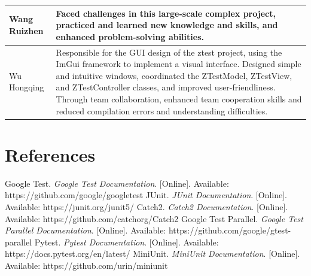 \documentclass{article}
\begin{document}
\begin{tabular}{|p{50pt}|p{350pt}|}
    Wang Ruizhen   & Faced challenges in this large-scale complex project, practiced and learned new knowledge and skills, and enhanced problem-solving abilities.                                                                                                                                                                                                                                                                                                                                                                                                                                                            \\ \hline
    Wu Hongqing    & Responsible for the GUI design of the ztest project, using the ImGui framework to implement a visual interface. Designed simple and intuitive windows, coordinated the ZTestModel, ZTestView, and ZTestController classes, and improved user-friendliness. Through team collaboration, enhanced team cooperation skills and reduced compilation errors and understanding difficulties.                                                                                                                                                                                                                   \\ \hline
\end{tabular}
\section{References}
\begin{thebibliography}{99}
     Google Test. \textit{Google Test Documentation}. [Online]. Available: https://github.com/google/googletest
     JUnit. \textit{JUnit Documentation}. [Online]. Available: https://junit.org/junit5/
     Catch2. \textit{Catch2 Documentation}. [Online]. Available: https://github.com/catchorg/Catch2
     Google Test Parallel. \textit{Google Test Parallel Documentation}. [Online]. Available: https://github.com/google/gtest-parallel
     Pytest. \textit{Pytest Documentation}. [Online]. Available: https://docs.pytest.org/en/latest/
     MiniUnit. \textit{MiniUnit Documentation}. [Online]. Available: https://github.com/urin/miniunit
\end{thebibliography}
\end{document}
